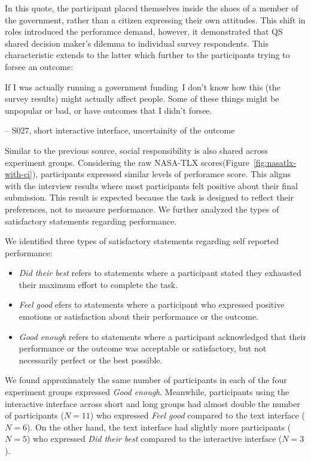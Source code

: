 In this quote, the participant placed themselves inside the shoes of a member of the government, rather than a citizen expressing their own attitudes. This shift in roles introduced the perforamce demand, however, it demonstrated that QS shared decision maker's dilemma to individual survey respondents. This characteristic extends to the latter which further to the participants trying to forsee an outcome:

\begin{displayquote}
If I was actually running a government funding~\bracketellipsis I don't know how this (the survey results) might actually affect people. Some of these things might be unpopular or bad, or have outcomes that I didn't forsee.
    
\noindent \hfill -- S027, short interactive interface, uncertainity of the outcome
\end{displayquote}

Similar to the previous source, social responsibility is also shared across experiment groups. Considering the raw NASA-TLX scores(Figure~\ref{fig:nasatlx-with-ci}), participants expressed similar levels of perforamce score. This aligns with the interview results where most participants felt positive about their final submission. This result is expected because the task is designed to reflect their preferences, not to measure performance. We further analyzed the types of satisfactory statements regarding performance.


We identified three types of satisfactory statements regarding self reported performance:
\begin{itemize}
    \item \textit{Did their best} refers to statements where a participant stated they exhausted their maximum effort to complete the task.
    \item \textit{Feel good} efers to statements where a participant who expressed positive emotions or satisfaction about their performance or the outcome.
    \item \textit{Good enough} refers to statements where a participant acknowledged that their performance or the outcome was acceptable or satisfactory, but not necessarily perfect or the best possible.
\end{itemize}

We found approximately the same number of participants in each of the four experiment groups expressed \textit{Good enough}. Meanwhile, participants using the interactive interface across short and long groups had almost double the number of participants ($N=11$) who expressed \textit{Feel good} compared to the text interface ($N=6$). On the other hand, the text interface had slightly more participants ($N=5$) who expressed \textit{Did their best} compared to the interactive interface ($N=3$).

